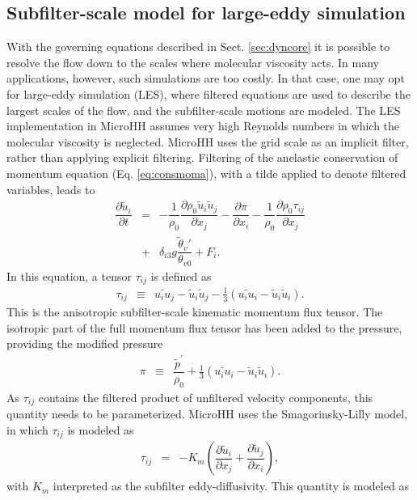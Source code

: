 \documentclass[gmd,manuscript]{copernicus}
\newcommand{\uf}{\ensuremath{\widetilde{u}}}
\newcommand{\thetaf}{\ensuremath{\widetilde{\theta}}}
\begin{document}
\subsection{Subfilter-scale model for large-eddy simulation}
With the governing equations described in Sect. \ref{sec:dyncore} it is possible to resolve the flow down to the scales where molecular viscosity acts. In many applications, however, such simulations are too costly. In that case, one may opt for large-eddy simulation (LES), where filtered equations are used to describe the largest scales of the flow, and the subfilter-scale motions are modeled. The LES implementation in MicroHH assumes very high Reynolds numbers in which the molecular viscosity is neglected. MicroHH uses the grid scale as an implicit filter, rather than applying explicit filtering. Filtering of the anelastic conservation of momentum equation (Eq. \ref{eq:consmoma}), with a tilde applied to denote filtered variables, leads to 
\begin{eqnarray}
\nonumber \dfrac{\partial \uf_i}{\partial t} & = & - \dfrac{1}{\rho_0} \dfrac{\partial \rho_0 \uf_i \uf_j}{\partial x_j} 
- \dfrac{\partial \pi}{\partial x_i} - \dfrac{1}{\rho_0} \dfrac{\partial \rho_0 \tau_{ij}}{\partial x_j}\\
& + & \delta_{i3} g \dfrac{\thetaf_v'}{\theta_{v0}} + F_i.\label{eq:consmoma_filter}
\end{eqnarray}
In this equation, a tensor $\tau_{ij}$ is defined as
\begin{eqnarray}
\tau_{ij}  & \equiv & \widetilde{u_i u_j} - \uf_i \uf_j - \frac{1}{3} \left( \widetilde{u_i u_i} - \uf_i \uf_i \right).
\end{eqnarray}
This is the anisotropic subfilter-scale kinematic momentum flux tensor. The isotropic part of the full momentum flux tensor has been added to the pressure, providing the modified pressure
\begin{eqnarray}
\pi & \equiv & \dfrac{\widetilde{p}^\prime}{\rho_0} + \frac{1}{3} \left( \widetilde{u_i u_i} - \uf_i \uf_i \right).
\end{eqnarray}
As $\tau_{ij}$ contains the filtered product of unfiltered velocity components, this quantity needs to be parameterized. MicroHH uses the Smagorinsky-Lilly \citep{Lilly1968} model, in which $\tau_{ij}$ is modeled as
\begin{eqnarray}
\tau_{ij} & = & -K_m \left( \dfrac{\partial \uf_i}{\partial x_j} + \dfrac{\partial \uf_j}{\partial x_i} \right),
\end{eqnarray}
with $K_m$ interpreted as the subfilter eddy-diffusivity. This quantity is modeled as 
\end{document}
